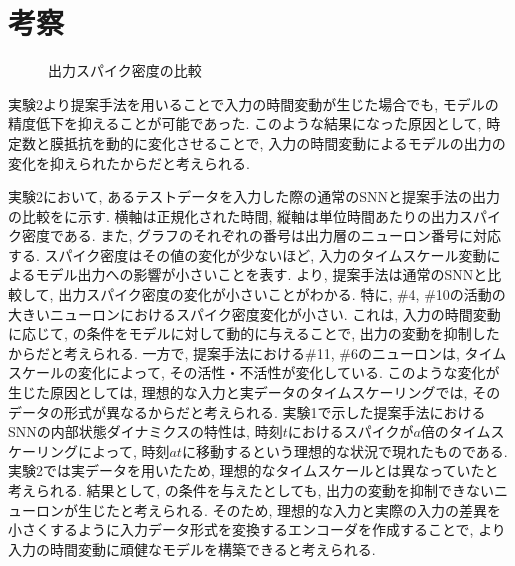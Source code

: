 \section{考察}

\begin{figure*}
    \centering
    \parbox{1.0\linewidth}{
        \centering

        \begin{minipage}{.48 \linewidth} %
            \centering
            
            \label{sec5:fig:snn}
        \end{minipage}
        \hspace{0.02\linewidth} %
        \begin{minipage}{.48 \linewidth} %
            \centering
            
            \label{sec5:fig:dyna}    
        \end{minipage}    

        \caption{出力スパイク密度の比較}
        \label{sec5:fig:disc}
    }
\end{figure*}

実験2より提案手法を用いることで入力の時間変動が生じた場合でも, モデルの精度低下を抑えることが可能であった.
このような結果になった原因として, 時定数と膜抵抗を動的に変化させることで, 入力の時間変動によるモデルの出力の変化を抑えられたからだと考えられる.

実験2において, あるテストデータを入力した際の通常のSNNと提案手法の出力の比較をに示す.
横軸は正規化された時間, 縦軸は単位時間あたりの出力スパイク密度である.
また, グラフのそれぞれの番号は出力層のニューロン番号に対応する.
スパイク密度はその値の変化が少ないほど, 入力のタイムスケール変動によるモデル出力への影響が小さいことを表す.
より, 提案手法は通常のSNNと比較して, 出力スパイク密度の変化が小さいことがわかる.
特に, \#4, \#10の活動の大きいニューロンにおけるスパイク密度変化が小さい.
これは, 入力の時間変動に応じて, の条件をモデルに対して動的に与えることで, 出力の変動を抑制したからだと考えられる.
一方で, 提案手法における\#11, \#6のニューロンは, タイムスケールの変化によって, その活性・不活性が変化している.
このような変化が生じた原因としては, 理想的な入力と実データのタイムスケーリングでは, そのデータの形式が異なるからだと考えられる.
実験1で示した提案手法におけるSNNの内部状態ダイナミクスの特性は, 時刻$t$におけるスパイクが$a$倍のタイムスケーリングによって, 時刻$at$に移動するという理想的な状況で現れたものである.
実験2では実データを用いたため, 理想的なタイムスケールとは異なっていたと考えられる.
結果として, の条件を与えたとしても, 出力の変動を抑制できないニューロンが生じたと考えられる.
そのため, 理想的な入力と実際の入力の差異を小さくするように入力データ形式を変換するエンコーダを作成することで, より入力の時間変動に頑健なモデルを構築できると考えられる.

% 
% 
% 